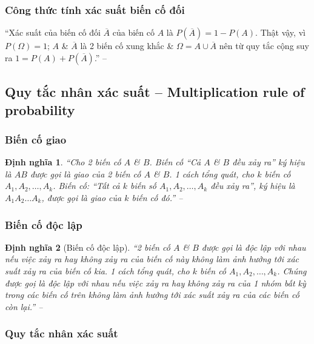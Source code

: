 \documentclass[oneside]{book}
\numberwithin{equation}{section}
\newtheorem{dinhnghia}{Định nghĩa}[section]
\begin{document}
\subsubsection{Công thức tính xác suất biến cố đối}
``Xác suất của biến cố đối $\overline{A}$ của biến cố $A$ là $P(\overline{A}) = 1 - P(A)$. Thật vậy, vì $P(\Omega) = 1$; $A$ \& $\overline{A}$ là 2 biến cố xung khắc \& $\Omega = A\cup\overline{A}$ nên từ quy tắc cộng suy ra $1 = P(A) + P(\overline{A})$.'' -- \cite[p. 100]{TL_chuyen_Toan_Dai_So_Giai_Tich_11}

\subsection{Quy tắc nhân xác suất -- Multiplication rule of probability}

\subsubsection{Biến cố giao}

\begin{dinhnghia}
	``Cho 2 biến cố $A$ \& $B$. Biến cố ``Cả $A$ \& $B$ đều xảy ra'' ký hiệu là $AB$ được gọi là \emph{giao} của 2 biến cố $A$ \& $B$. 1 cách tổng quát, cho $k$ biến cố $A_1,A_2,\ldots,A_k$. Biến cố: ``Tất cả $k$ biến số $A_1,A_2,\ldots,A_k$ đều xảy ra'', ký hiệu là $A_1A_2\ldots A_k$, được gọi là \emph{giao} của $k$ biến cố đó.'' -- \cite[p. 101]{TL_chuyen_Toan_Dai_So_Giai_Tich_11}
\end{dinhnghia}

\subsubsection{Biến cố độc lập}

\begin{dinhnghia}[Biến cố độc lập]
	``2 biến cố $A$ \& $B$ được gọi là \emph{độc lập với nhau} nếu việc xảy ra hay không xảy ra của biến cố này không làm ảnh hưởng tới xác suất xảy ra của biến cố kia. 1 cách tổng quát, cho $k$ biến cố $A_1,A_2,\ldots,A_k$. Chúng được goị là \emph{độc lập với nhau} nếu việc xảy ra hay không xảy ra của 1 nhóm bất kỳ trong các biến cố trên không làm ảnh hưởng tới xác suất xảy ra của các biến cố còn lại.'' -- \cite[p. 101]{TL_chuyen_Toan_Dai_So_Giai_Tich_11}
\end{dinhnghia}

\subsubsection{Quy tắc nhân xác suất}
\end{document}

